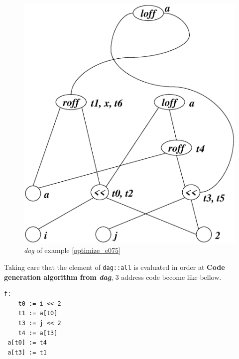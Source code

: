 \begin{Example}
\begin{figure}[htbp]
\begin{center}
\begin{latexonly}
\includegraphics[width=1.0\linewidth,height=1.069\linewidth]{opt031.eps}
\end{latexonly}
\caption{{\em dag} of example \ref{optimize_e075}}
\label{optimize_e076}
\end{center}
\end{figure}
Taking care that the element of {\tt{dag::all}}
is evaluated in order at
{\bf Code generation algorithm from {\em dag}},
3 address code become like bellow.
\begin{verbatim}
f:
    t0 := i << 2
    t1 := a[t0]
    t3 := j << 2
    t4 := a[t3]
 a[t0] := t4
 a[t3] := t1
\end{verbatim}
\end{Example}

